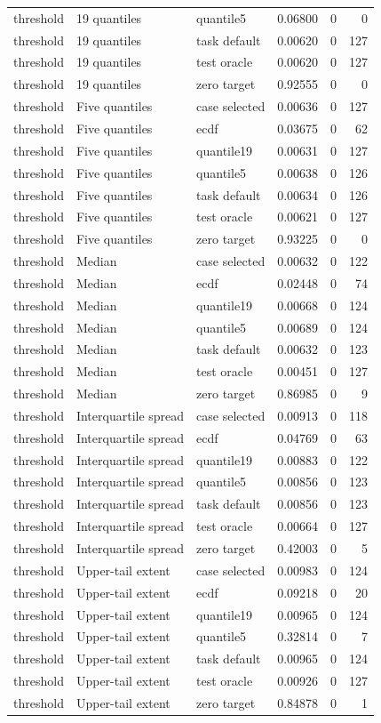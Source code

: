\begin{longtable}{lllrrr}
threshold & 19 quantiles & quantile5 & 0.06800 & 0 & 0\\
threshold & 19 quantiles & task default & 0.00620 & 0 & 127\\
threshold & 19 quantiles & test oracle & 0.00620 & 0 & 127\\
threshold & 19 quantiles & zero target & 0.92555 & 0 & 0\\
threshold & Five quantiles & case selected & 0.00636 & 0 & 127\\
threshold & Five quantiles & ecdf & 0.03675 & 0 & 62\\
threshold & Five quantiles & quantile19 & 0.00631 & 0 & 127\\
threshold & Five quantiles & quantile5 & 0.00638 & 0 & 126\\
threshold & Five quantiles & task default & 0.00634 & 0 & 126\\
threshold & Five quantiles & test oracle & 0.00621 & 0 & 127\\
threshold & Five quantiles & zero target & 0.93225 & 0 & 0\\
threshold & Median & case selected & 0.00632 & 0 & 122\\
threshold & Median & ecdf & 0.02448 & 0 & 74\\
threshold & Median & quantile19 & 0.00668 & 0 & 124\\
threshold & Median & quantile5 & 0.00689 & 0 & 124\\
threshold & Median & task default & 0.00632 & 0 & 123\\
threshold & Median & test oracle & 0.00451 & 0 & 127\\
threshold & Median & zero target & 0.86985 & 0 & 9\\
threshold & Interquartile spread & case selected & 0.00913 & 0 & 118\\
threshold & Interquartile spread & ecdf & 0.04769 & 0 & 63\\
threshold & Interquartile spread & quantile19 & 0.00883 & 0 & 122\\
threshold & Interquartile spread & quantile5 & 0.00856 & 0 & 123\\
threshold & Interquartile spread & task default & 0.00856 & 0 & 123\\
threshold & Interquartile spread & test oracle & 0.00664 & 0 & 127\\
threshold & Interquartile spread & zero target & 0.42003 & 0 & 5\\
threshold & Upper-tail extent & case selected & 0.00983 & 0 & 124\\
threshold & Upper-tail extent & ecdf & 0.09218 & 0 & 20\\
threshold & Upper-tail extent & quantile19 & 0.00965 & 0 & 124\\
threshold & Upper-tail extent & quantile5 & 0.32814 & 0 & 7\\
threshold & Upper-tail extent & task default & 0.00965 & 0 & 124\\
threshold & Upper-tail extent & test oracle & 0.00926 & 0 & 127\\
threshold & Upper-tail extent & zero target & 0.84878 & 0 & 1\\
\bottomrule\end{longtable}
